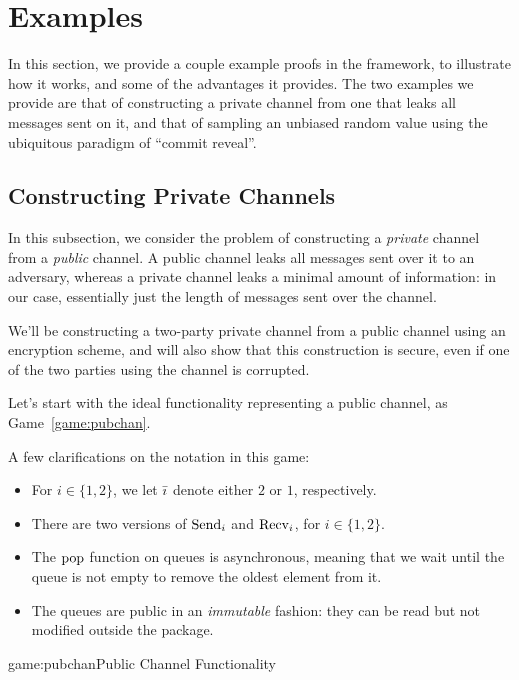 \section{Examples}

In this section, we provide a couple example proofs in the framework,
to illustrate how it works, and some of the advantages it provides.
The two examples we provide are that of constructing a private
channel from one that leaks all messages sent on it,
and that of sampling an unbiased random value using
the ubiquitous paradigm of ``commit reveal''.

\subsection{Constructing Private Channels}

In this subsection, we consider the problem of constructing a \emph{private}
channel from a \emph{public} channel.
A public channel leaks all messages sent over it to an adversary,
whereas a private channel leaks a minimal amount of information:
in our case, essentially just the length of messages sent over the channel.

We'll be constructing a two-party private channel from a public channel
using an encryption scheme, and will also show that this construction is secure,
even if one of the two parties using the channel is corrupted.

Let's start with the ideal functionality representing a public channel,
as Game~\ref{game:pubchan}.

A few clarifications on the notation in this game:
\begin{itemize}
    \item For $i \in \{1, 2\}$, we let $\bar{\imath}$ denote either $2$ or $1$, respectively.
    \item There are two versions of $\text{Send}_i$ and $\text{Recv}_i$, for $i \in \{1, 2\}$.
    \item The $\text{pop}$ function on queues is asynchronous, meaning that we wait until the queue is not empty
    to remove the oldest element from it.
    \item The queues are public in an \emph{immutable} fashion: they can be read but not modified outside the package.
\end{itemize}

\begin{game}{game:pubchan}{Public Channel Functionality}
\end{game}

